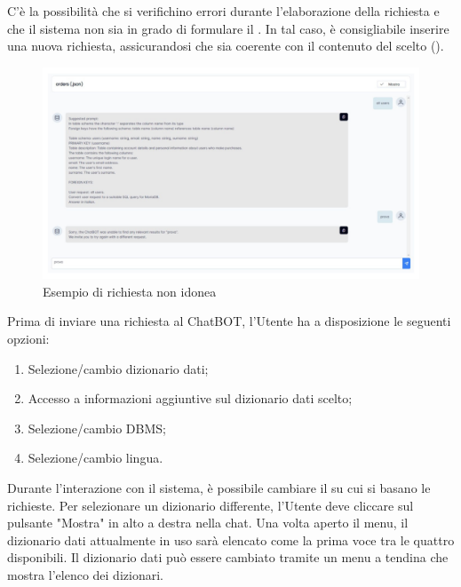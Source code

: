\par C'è la possibilità che si verifichino errori durante l'elaborazione della richiesta e che il sistema non sia in grado di formulare il . In tal caso, è consigliabile inserire una nuova richiesta, assicurandosi che sia coerente con il contenuto del  scelto ().

\begin{figure}[H]
  \centering
  \includegraphics[width=\textwidth]{assets/es_chat_errore.png}
  \caption{Esempio di richiesta non idonea}
\end{figure}

\par Prima di inviare una richiesta al ChatBOT, l'Utente ha a disposizione le seguenti opzioni:
\begin{enumerate}
  \item Selezione/cambio dizionario dati;
  \item Accesso a informazioni aggiuntive sul dizionario dati scelto;
  \item Selezione/cambio DBMS;
  \item Selezione/cambio lingua.
\end{enumerate}


\par Durante l'interazione con il sistema, è possibile cambiare il  su cui si basano le richieste. Per selezionare un dizionario differente, l'Utente deve cliccare sul pulsante "Mostra" in alto a destra nella chat. Una volta aperto il menu, il dizionario dati attualmente in uso sarà elencato come la prima voce tra le quattro disponibili. Il dizionario dati può essere cambiato tramite un menu a tendina che mostra l'elenco dei dizionari.

